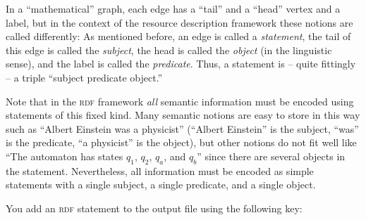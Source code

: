 In a ``mathematical'' graph, each edge has a ``tail'' and a
``head'' vertex and a label, but in the context of the resource
description framework these notions are called differently: As
mentioned before, an edge is called a \emph{statement}, the tail of
this edge is called the \emph{subject}, the head is called the
\emph{object} (in the linguistic sense), and the label is called the
\emph{predicate}. Thus, a statement is -- quite fittingly -- a triple
``subject predicate object.''

Note that in the \textsc{rdf} framework \emph{all} semantic
information must be encoded using statements of this fixed kind. Many
semantic notions are easy to store in this way such as ``Albert
Einstein was a physicist'' (``Albert Einstein'' is the subject,
``was'' is the predicate, ``a physicist'' is the object), but other
notions do not fit well like ``The automaton has states $q_1$, $q_2$,
$q_a$, and $q_b$'' since there are several objects in the
statement. Nevertheless, all information must be encoded as simple
statements with a single subject, a single predicate, and a single
object.

You add an \textsc{rdf} statement to the output file using the
following key:

